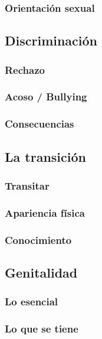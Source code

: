 \subsubsection{Orientación sexual}

\subsection{Discriminación}

\subsubsection{Rechazo}

\subsubsection{Acoso / Bullying}

\subsubsection{Consecuencias}

\subsection{La transición}

\subsubsection{Transitar}

\subsubsection{Apariencia física}

\subsubsection{Conocimiento}

\subsection{Genitalidad}

\subsubsection{Lo esencial}

\subsubsection{Lo que se tiene}

